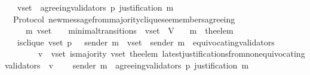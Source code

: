 \begin{isabellebody}
\ \ {\isasymlongrightarrow}\ v{\isacharunderscore}set\ {\isasymsubseteq}\ agreeing{\isacharunderscore}validators\ {\isacharparenleft}p{\isacharcomma}\ justification\ m{\isacharprime}{\isacharparenright}{\isachardoublequoteclose}\isanewline
%
\isadelimproof
\ \ %
\endisadelimproof
%
\isatagproof
{}\isamarkupfalse%
%
\endisatagproof
{\isafoldproof}%
%
\isadelimproof
\isanewline
%
\endisadelimproof
\isanewline
\isanewline
\isanewline
\isanewline
{}\isamarkupfalse%
\ {\isacharparenleft}\ Protocol{\isacharparenright}\ new{\isacharunderscore}message{\isacharunderscore}from{\isacharunderscore}majority{\isacharunderscore}clique{\isacharunderscore}see{\isacharunderscore}members{\isacharunderscore}agreeing\ {\isacharcolon}\isanewline
\ \ {\isachardoublequoteopen}{\isasymforall}\ {\isasymsigma}\ {\isasymsigma}{\isacharprime}\ m{\isacharprime}\ v{\isacharunderscore}set{\isachardot}\ {\isacharparenleft}{\isasymsigma}{\isacharcomma}\ {\isasymsigma}{\isacharprime}{\isacharparenright}\ {\isasymin}\ minimal{\isacharunderscore}transitions\ {\isasymand}\ v{\isacharunderscore}set\ {\isasymsubseteq}\ V\isanewline
\ \ {\isasymlongrightarrow}\ m{\isacharprime}\ {\isacharequal}\ the{\isacharunderscore}elem\ {\isacharparenleft}{\isasymsigma}{\isacharprime}\ {\isacharminus}\ {\isasymsigma}{\isacharparenright}\isanewline
\ \ {\isasymlongrightarrow}\ is{\isacharunderscore}clique\ {\isacharparenleft}v{\isacharunderscore}set{\isacharcomma}\ p{\isacharcomma}\ {\isasymsigma}{\isacharparenright}\ {\isasymand}\ sender\ m{\isacharprime}\ {\isasymin}\ v{\isacharunderscore}set\ {\isasymand}\ sender\ m{\isacharprime}\ {\isasymnotin}\ equivocating{\isacharunderscore}validators\ {\isasymsigma}{\isacharprime}\isanewline
\ \ \ \ \ \ {\isasymand}\ {\isacharparenleft}{\isasymforall}\ v\ {\isasymin}\ v{\isacharunderscore}set{\isachardot}\ is{\isacharunderscore}majority\ {\isacharparenleft}v{\isacharunderscore}set{\isacharcomma}\ the{\isacharunderscore}elem\ {\isacharparenleft}latest{\isacharunderscore}justifications{\isacharunderscore}from{\isacharunderscore}non{\isacharunderscore}equivocating{\isacharunderscore}validators\ {\isasymsigma}\ v{\isacharparenright}{\isacharparenright}{\isacharparenright}\ \isanewline
\ \ {\isasymlongrightarrow}\ sender\ m{\isacharprime}\ {\isasymin}\ agreeing{\isacharunderscore}validators\ {\isacharparenleft}p{\isacharcomma}\ justification\ m{\isacharprime}{\isacharparenright}{\isachardoublequoteclose}\isanewline
%
\isadelimproof
\ \ %
\endisadelimproof
%
\isatagproof
{}\isamarkupfalse%
%
\endisatagproof
{\isafoldproof}%

\end{isabellebody}
